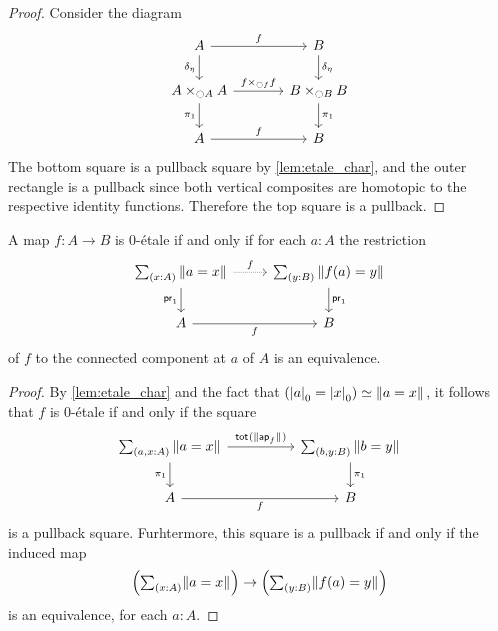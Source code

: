\begin{proof}
Consider the diagram
\begin{equation*}
\begin{tikzcd}[column sep=large]
A \arrow[d,swap,"\delta_{\modalunit}"] \arrow[r,"f"] & B \arrow[d,"\delta_{\modalunit}"] \\
A\times_{\modal A} A \arrow[d,swap,"\pi_1"] \arrow[r,"{f\times_{\modal f} f}"] & B\times_{\modal B} B \arrow[d,"\pi_1"] \\
A \arrow[r,"f"] & B
\end{tikzcd}
\end{equation*}
The bottom square is a pullback square by \cref{lem:etale_char}, and the outer rectangle is a pullback since both vertical composites are homotopic to the respective identity functions. Therefore the top square is a pullback.
\end{proof}

\begin{thm}
A map $f:A\to B$ is $0$-\'etale if and only if for each $a:A$ the restriction
\begin{equation*}
\begin{tikzcd}
\sm{x:A}\brck{a=x} \arrow[d,swap,"\proj 1"] \arrow[r,densely dotted,"f"] & \sm{y:B}\brck{f(a)=y} \arrow[d,"\proj 1"] \\
A \arrow[r,swap,"f"] & B
\end{tikzcd}
\end{equation*}
of $f$ to the connected component at $a$ of $A$ is an equivalence. 
\end{thm}

\begin{proof}
By \cref{lem:etale_char} and the fact that $\eqv{(\tproj{0}{a}=\tproj{0}{x})}{\brck{a=x}}$, it follows that $f$ is $0$-\'etale if and only if the square
\begin{equation*}
\begin{tikzcd}[column sep=huge]
\sm{a,x:A}\brck{a=x} \arrow[d,swap,"\pi_1"] \arrow[r,"\total{\brck{\apfunc{f}}}"] & \sm{b,y:B}\brck{b=y} \arrow[d,"\pi_1"] \\
A \arrow[r,swap,"f"] & B
\end{tikzcd}
\end{equation*}
is a pullback square. Furhtermore, this square is a pullback if and only if the induced map
\begin{equation*}
\Big(\sm{x:A}\brck{a=x}\Big)\to\Big(\sm{y:B}\brck{f(a)=y}\Big)
\end{equation*}
is an equivalence, for each $a:A$.
\end{proof}

